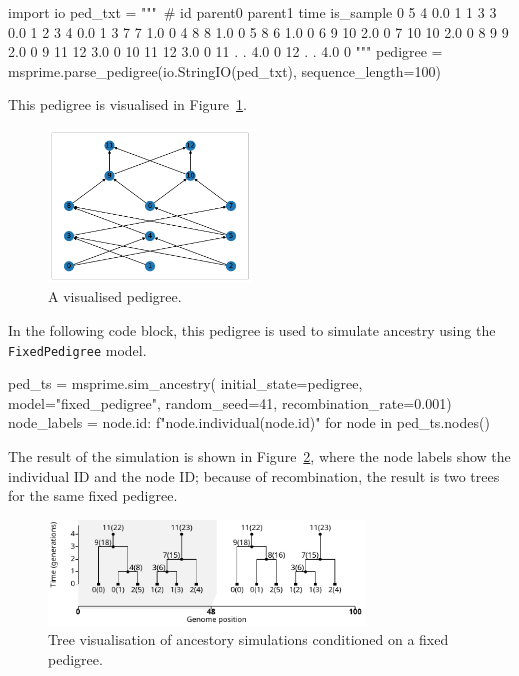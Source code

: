 \documentclass[graybox]{svmult}
\begin{document}
\begin{pythoncode}
import io
ped_txt = """\
# id parent0 parent1 time is_sample
0   5   4   0.0 1
1   3   3   0.0 1
2   3   4   0.0 1
3   7   7   1.0 0
4   8   8   1.0 0
5   8   6   1.0 0
6   9   10  2.0 0
7   10  10  2.0 0
8   9   9   2.0 0
9   11  12  3.0 0
10  11  12  3.0 0
11  .   .   4.0 0
12  .   .   4.0 0
"""
pedigree = msprime.parse_pedigree(io.StringIO(ped_txt), sequence_length=100)
\end{pythoncode}

This pedigree is visualised in Figure~\ref{fig:pedigree}.

\begin{figure}
\begin{center}
\includegraphics[width=0.48\textwidth]{images/pedigree.pdf}
\end{center}
\caption{\label{fig:pedigree} A visualised pedigree.}
\end{figure}

In the following code block, this pedigree is used to simulate ancestry using the \texttt{FixedPedigree} model.

\begin{pythoncode}
ped_ts = msprime.sim_ancestry(
    initial_state=pedigree, model="fixed_pedigree",
    random_seed=41, recombination_rate=0.001)
node_labels = {node.id: f"{node.individual}({node.id})"
    for node in ped_ts.nodes()}
\end{pythoncode}

The result of the simulation is shown in Figure~\ref{fig:pedigree-simulation}, where the node labels show the individual ID and the node ID;
 because of recombination, the result is two trees for the same fixed pedigree.

\begin{figure}
\begin{center}
\includegraphics[width=0.75\textwidth]{images/pedigree-simulation.pdf}
\end{center}
\caption{\label{fig:pedigree-simulation} Tree visualisation of ancestory simulations conditioned on a fixed pedigree.}
\end{figure}
\end{document}

